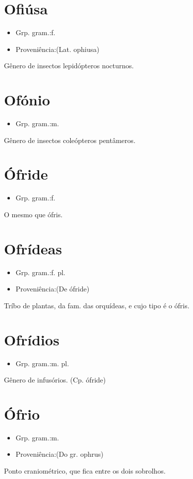 \section{Ofiúsa}
\begin{itemize}
\item {Grp. gram.:f.}
\end{itemize}
\begin{itemize}
\item {Proveniência:(Lat. \textunderscore ophiusa\textunderscore )}
\end{itemize}
Gênero de insectos lepidópteros nocturnos.
\section{Ofónio}
\begin{itemize}
\item {Grp. gram.:m.}
\end{itemize}
Gênero de insectos coleópteros pentâmeros.
\section{Ófride}
\begin{itemize}
\item {Grp. gram.:f.}
\end{itemize}
O mesmo que \textunderscore ófris\textunderscore .
\section{Ofrídeas}
\begin{itemize}
\item {Grp. gram.:f. pl.}
\end{itemize}
\begin{itemize}
\item {Proveniência:(De \textunderscore ófride\textunderscore )}
\end{itemize}
Tríbo de plantas, da fam. das orquídeas, e cujo tipo é o ófris.
\section{Ofrídios}
\begin{itemize}
\item {Grp. gram.:m. pl.}
\end{itemize}
Gênero de infusórios.
(Cp. \textunderscore ófride\textunderscore )
\section{Ófrio}
\begin{itemize}
\item {Grp. gram.:m.}
\end{itemize}
\begin{itemize}
\item {Proveniência:(Do gr. \textunderscore ophrus\textunderscore )}
\end{itemize}
Ponto craniométrico, que fica entre os dois sobrolhos.
